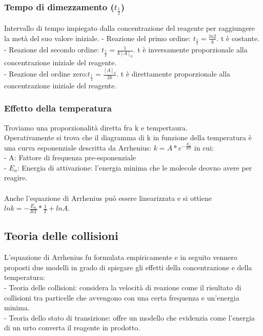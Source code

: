 \subsubsection{Tempo di dimezzamento ($t_\frac{1}{2}$)}
Intervallo di tempo impiegato dalla concentrazione del reagente per raggiungere la metà del suo valore iniziale.    
\tab- Reazione del primo ordine: $t_\frac{1}{2} = \frac{ln2}{k}$. t è costante.\\
\tab- Reazione del secondo ordine: $t_\frac{1}{2} = \frac{1}{k[A]_0}$. t è inversamente proporzionale alla concentrazione iniziale del reagente.\\
\tab- Reazione del ordine zero:$t_\frac{1}{2} = \frac{[A]_0}{2k}$. t è direttamente proporzionale alla concentrazione iniziale del reagente.\\
\subsubsection{Effetto della temperatura}
Troviamo una proporzionalità diretta fra k e tempertaura. \\
Operativamente si trova che il diagramma di k in funzione della temperatura è una curva esponenziale descritta da Arrhenius: $k = A* e^{-\frac{E_a}{RT}}$ in cui:\\
\tab- A: Fattore di frequenza pre-esponenziale\\
\tab- $E_a$: Energia di attivazione: l'energia minima che le molecole deovno avere per reagire.\\\\
Anche l'equazione di Arrhenius può essere linearizzata e si ottiene $lnk = -\frac{E_a}{RT} * \frac{1}{T} + lnA$.
\subsection{Teoria delle collisioni}
L'equazione di Arrhenius fu formulata empiricamente e in seguito vennero proposti due modelli in grado di spiegare gli effetti della concentrazione e della temperatura:\\
\tab- Teoria delle collisioni: considera la velocità di reazione come il risultato di collisioni tra particelle che avvengono con una certa frequenza e un'energia minima.\\
\tab- Teoria dello stato di transizione: offre un modello che evidenzia come l'energia di un urto converta il reagente in prodotto.\\
